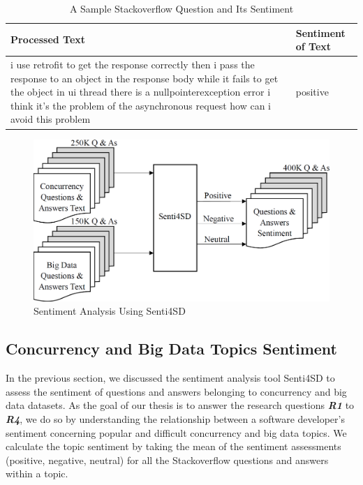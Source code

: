 \begin{table}[h!tb]
\caption{A Sample Stackoverflow Question and Its Sentiment}
\label{SE}
\centering
\begin{tabular}{p{3.5in}p{2in}}\hline
\textbf{Processed Text} & \textbf{Sentiment of Text} \\\hline
{i use retrofit to get the response correctly then i pass the response to an object in the response body while it fails to get the object in ui thread there is a nullpointerexception error i think it's the problem of the asynchronous request how can i avoid this problem} & {positive} \\ \hline 
\end{tabular}
\end{table}

\begin{figure}[h!tb]
\centering 
\includegraphics{Images/Sentiment}
\caption{Sentiment Analysis Using Senti4SD}
\label{step1}
\end{figure}

\subsection{Concurrency and Big Data Topics Sentiment}
\label{topicsenti}
In the previous section, we discussed the sentiment analysis tool Senti4SD to assess the sentiment of questions and answers belonging to concurrency and big data datasets. As the goal of our thesis is to answer the research questions \emph{\textbf{R1}} to \emph{\textbf{R4}}, we do so by understanding the relationship between a software developer's sentiment concerning popular and difficult concurrency and big data topics. We calculate the topic sentiment by taking the mean of the sentiment assessments (positive, negative, neutral) for all the Stackoverflow questions and answers within a topic.

